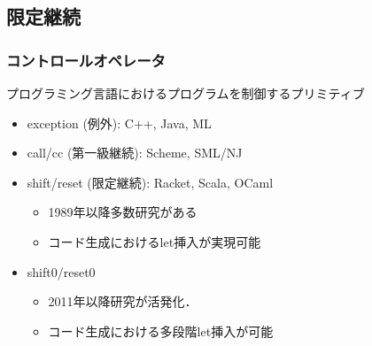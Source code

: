 \documentclass[dvipdfmx,cjk,xcolor=dvipsnames,envcountsect,notheorems,12pt]{beamer}
\newcommand\cResetz{\underline{\textbf{reset0}}}
\newcommand\cShiftz{\underline{\textbf{shift0}}}
\theoremstyle{definition}
\begin{document}
\subsection{限定継続}

\begin{frame}
  \frametitle{コントロールオペレータ}
  \begin{block}{プログラミング言語におけるプログラムを制御するプリミティブ}
    \begin{itemize}
    \item exception (例外): C++, Java, ML
    \item call/cc (第一級継続): Scheme, SML/NJ
    \item shift/reset (限定継続): Racket, Scala, OCaml
      \begin{itemize}
      \item 1989年以降多数研究がある
      \item コード生成におけるlet挿入が実現可能
      \end{itemize}
    \item \alert{shift0/reset0}
      \begin{itemize}
        \item 2011年以降研究が活発化．
        \item コード生成における\alert{多段階let挿入}が可能
      \end{itemize}
    \end{itemize}
  \end{block}
\end{frame}



\end{document}

